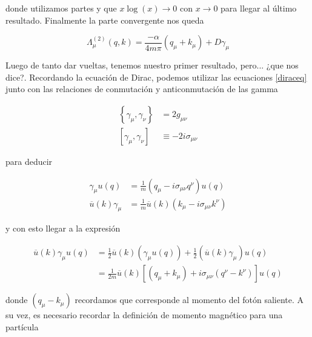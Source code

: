 \documentclass[tickz]{article}
\numberwithin{equation}{section}
\begin{document}
donde utilizamos partes y que $ x\log(x) \longrightarrow 0 $ con $ x \rightarrow 0 $ para llegar al último resultado. Finalmente la parte convergente nos queda

\begin{boxquation}
\begin{equation}\label{lambdaconver}
\Lambda^{(2)}_{\mu}(q,k) = \frac{-\alpha}{4m\pi} \left(q_{\mu} + k_{\mu}\right) + D\gamma_{\mu}
\end{equation}
\end{boxquation}

Luego de tanto dar vueltas, tenemos nuestro primer resultado, pero... ¿que nos dice?. Recordando la ecuación de Dirac, podemos utilizar las ecuaciones \ref{diraceq} junto con las relaciones de conmutación y anticonmutación de las gamma

\begin{equation}\label{key}
\begin{aligned}
\left\{ \gamma_{\mu},\gamma_{\nu} \right\} &= 2g_{\mu\nu}\\
\left[\gamma_{\mu},\gamma_{\nu}\right]& \equiv -2i \sigma_{\mu\nu}
\end{aligned}
\end{equation}

para deducir

\begin{equation}\label{key}
\begin{aligned}
\gamma_{\mu} u(q) &= \frac{1}{m}\left(q_{\mu} -i\sigma_{\mu\nu}q^{\nu} \right)u(q)\\
\overline{u}(k)\gamma_{\mu} &= \frac{1}{m}\overline{u}(k)\left(k_{\mu} -i\sigma_{\mu\nu}k^{\nu} \right)
\end{aligned}
\end{equation} 

y con esto llegar a la expresión

\begin{equation}\label{aux9}
\begin{aligned}
\overline{u}(k) \gamma_{\mu}u(q) &= \frac{1}{2} \overline{u}(k) \left(\gamma_{\mu} u(q)\right) + \frac{1}{2} \left(\overline{u}(k) \gamma_{\mu}\right) u(q)\\
&=\frac{1}{2m}\overline{u}(k)\left[\left(q_{\mu} + k_{\mu}\right) + i\sigma_{\mu\nu} \left(q^{\nu} - k^{\nu}\right)\right]u(q)
\end{aligned}
\end{equation}

donde $ \left(q_{\mu} - k_{\mu}\right) $  recordamos que corresponde al momento del fotón saliente. A su vez, es necesario recordar la definición de momento magnético para una partícula
\end{document}
